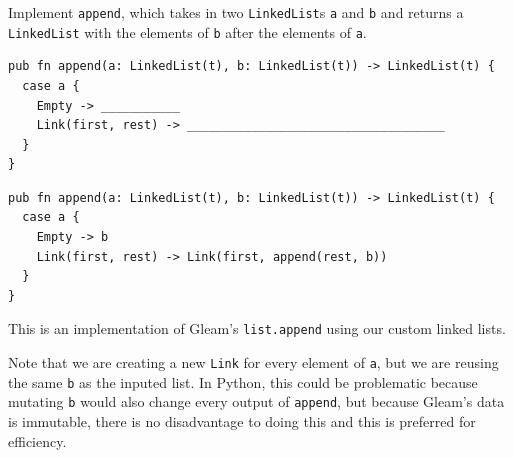 \begin{blocksection}
\question Implement \texttt{append}, which takes in two \lstinline{LinkedList}s \texttt{a} and \texttt{b} and returns a \lstinline{LinkedList} with the elements of \texttt{b} after the elements of \texttt{a}.
\begin{lstlisting}
pub fn append(a: LinkedList(t), b: LinkedList(t)) -> LinkedList(t) {
  case a {
    Empty -> ___________
    Link(first, rest) -> ____________________________________
  }
}
\end{lstlisting}

\begin{solution}
\begin{lstlisting}
pub fn append(a: LinkedList(t), b: LinkedList(t)) -> LinkedList(t) {
  case a {
    Empty -> b
    Link(first, rest) -> Link(first, append(rest, b))
  }
}
\end{lstlisting}
\end{solution}

\begin{questionmeta}
  This is an implementation of Gleam's \lstinline{list.append} using our custom linked lists.
  
  Note that we are creating a new \lstinline{Link} for every element of \lstinline{a}, but we are reusing the same \lstinline{b} as the inputed list.
  In Python, this could be problematic because mutating \lstinline{b} would also change every output of \lstinline{append}, but because Gleam's data is immutable, there is no disadvantage to doing this and this is preferred for efficiency.
\end{questionmeta}
\end{blocksection}
